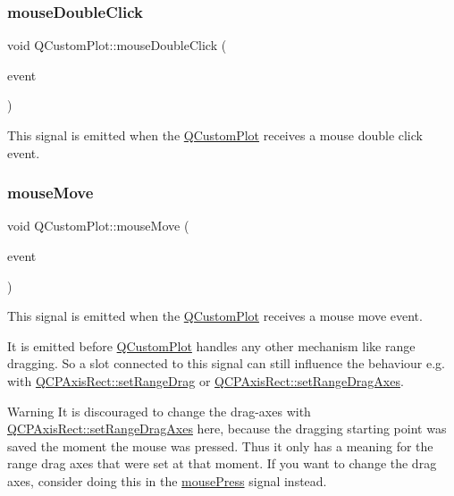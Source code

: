 \subsubsection{\texorpdfstring{mouse\+Double\+Click}{mouseDoubleClick}}
{\footnotesize\ttfamily void Q\+Custom\+Plot\+::mouse\+Double\+Click (\begin{DoxyParamCaption}\item[{Q\+Mouse\+Event $\ast$}]{event }\end{DoxyParamCaption})\hspace{0.3cm}{\ttfamily [signal]}}

This signal is emitted when the \hyperlink{classQCustomPlot}{Q\+Custom\+Plot} receives a mouse double click event. \mbox{\label{classQCustomPlot_a742ca4f94688bed2a685fd8a56ce5704}} 
\subsubsection{\texorpdfstring{mouse\+Move}{mouseMove}}
{\footnotesize\ttfamily void Q\+Custom\+Plot\+::mouse\+Move (\begin{DoxyParamCaption}\item[{Q\+Mouse\+Event $\ast$}]{event }\end{DoxyParamCaption})\hspace{0.3cm}{\ttfamily [signal]}}

This signal is emitted when the \hyperlink{classQCustomPlot}{Q\+Custom\+Plot} receives a mouse move event.

It is emitted before \hyperlink{classQCustomPlot}{Q\+Custom\+Plot} handles any other mechanism like range dragging. So a slot connected to this signal can still influence the behaviour e.\+g. with \hyperlink{classQCPAxisRect_ae6aef2f7211ba6097c925dcd26008418}{Q\+C\+P\+Axis\+Rect\+::set\+Range\+Drag} or \hyperlink{classQCPAxisRect_a648cce336bd99daac4a5ca3e5743775d}{Q\+C\+P\+Axis\+Rect\+::set\+Range\+Drag\+Axes}.

\begin{DoxyWarning}{Warning}
It is discouraged to change the drag-\/axes with \hyperlink{classQCPAxisRect_a648cce336bd99daac4a5ca3e5743775d}{Q\+C\+P\+Axis\+Rect\+::set\+Range\+Drag\+Axes} here, because the dragging starting point was saved the moment the mouse was pressed. Thus it only has a meaning for the range drag axes that were set at that moment. If you want to change the drag axes, consider doing this in the \hyperlink{classQCustomPlot_aca75bf9afb5dd19349c375de2a87a051}{mouse\+Press} signal instead. 
\end{DoxyWarning}
\mbox{\label{classQCustomPlot_aca75bf9afb5dd19349c375de2a87a051}} 
